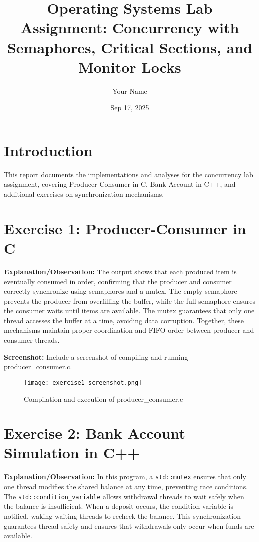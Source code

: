 \documentclass{article}
\begin{document}
\title{Operating Systems Lab Assignment: Concurrency with Semaphores, Critical Sections, and Monitor Locks}
\author{Your Name}
\date{Sep 17, 2025}
\maketitle

\section{Introduction}
This report documents the implementations and analyses for the concurrency lab assignment,
covering Producer-Consumer in C, Bank Account in C++, and additional exercises on
synchronization mechanisms.

\section{Exercise 1: Producer-Consumer in C}


\textbf{Explanation/Observation:}  
The output shows that each produced item is eventually consumed in order, confirming that the producer and consumer correctly synchronize using semaphores and a mutex. The empty semaphore prevents the producer from overfilling the buffer, while the full semaphore ensures the consumer waits until items are available. The mutex guarantees that only one thread accesses the buffer at a time, avoiding data corruption. Together, these mechanisms maintain proper coordination and FIFO order between producer and consumer threads.

\textbf{Screenshot:} Include a screenshot of compiling and running producer\_consumer.c.
\begin{figure}[h]
\centering
\texttt{[image: exercise1\_screenshot.png]}
\caption{Compilation and execution of producer\_consumer.c}
\end{figure}

\section{Exercise 2: Bank Account Simulation in C++}


\textbf{Explanation/Observation:}  
In this program, a \texttt{std::mutex} ensures that only one thread modifies the shared balance at any time, preventing race conditions. The \texttt{std::condition\_variable} allows withdrawal threads to wait safely when the balance is insufficient. When a deposit occurs, the condition variable is notified, waking waiting threads to recheck the balance. This synchronization guarantees thread safety and ensures that withdrawals only occur when funds are available.
\end{document}
